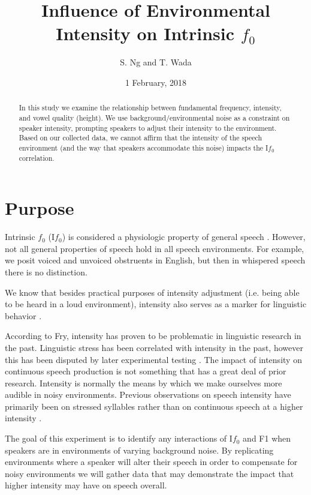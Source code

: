 \documentclass[12pt]{article}
\begin{document}
	\title{Influence of Environmental Intensity on Intrinsic $f_0$}
	\author{S. Ng and T. Wada}
	\date{1 February, 2018}
	
	\maketitle
	\pagebreak
	\begin{abstract}
		In this study we examine the relationship between fundamental frequency, intensity, and vowel quality (height).  We use background/environmental noise as a constraint on speaker intensity, prompting speakers to adjust their intensity to the environment.  Based on our collected data, we cannot affirm that the intensity of the speech environment (and the way that speakers accommodate this noise) impacts the I$f_0$ correlation.
	\end{abstract}
	\pagebreak
	\section{Purpose}
	Intrinsic $f_0$ (I$f_0$) is considered a physiologic property of general speech \citep{whale}.  However, not all general properties of speech hold in all speech environments.  For example, we posit voiced and unvoiced obstruents in English, but then in whispered speech there is no distinction.  
	
	We know that besides practical purposes of intensity adjustment (i.e. being able to be heard in a loud environment), intensity also serves as a marker for linguistic behavior \citep{fry}.

	According to Fry, intensity has proven to be problematic in linguistic research in the past. Linguistic stress has been correlated with intensity in the past, however this has been disputed by later experimental testing \citep{mole}. The impact of intensity on continuous speech production is not something that has a great deal of prior research. Intensity is normally the means by which we make ourselves more audible in noisy environments. Previous observations on speech intensity have primarily been on stressed syllables rather than on continuous speech at a higher intensity \citep{sluit}.
	
	The goal of this experiment is to identify any interactions of I$f_0$ and F1 when speakers are in environments of varying background noise. By replicating environments where a speaker will alter their speech in order to compensate for noisy environments we will gather data that may demonstrate the impact that higher intensity may have on speech overall.
	
\end{document}
